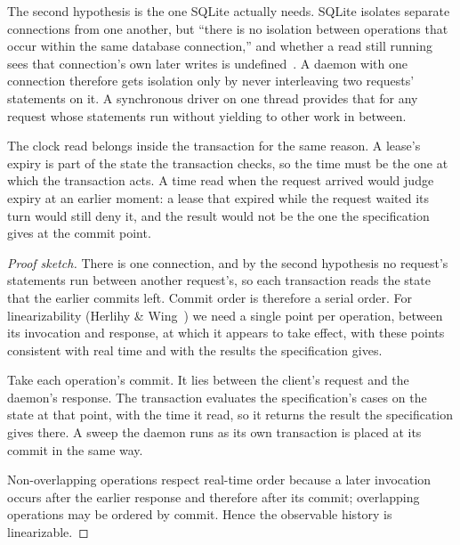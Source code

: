 \documentclass[11pt,a4paper]{article}
\theoremstyle{definition}
\theoremstyle{remark}
\begin{document}
The second hypothesis is the one SQLite actually needs. SQLite isolates
separate connections from one another, but ``there is no isolation between
operations that occur within the same database connection,'' and whether a
read still running sees that connection's own later writes is
undefined~. A daemon with one connection therefore
gets isolation only by never interleaving two requests' statements on it. A
synchronous driver on one thread provides that for any request whose
statements run without yielding to other work in between.

The clock read belongs inside the transaction for the same reason. A lease's
expiry is part of the state the transaction checks, so the time must be the
one at which the transaction acts. A time read when the request arrived would
judge expiry at an earlier moment: a lease that expired while the request
waited its turn would still deny it, and the result would not be the one the
specification gives at the commit point.

\begin{proof}[Proof sketch]
\setlength{\parskip}{4pt plus 1pt}
There is one connection, and by the second hypothesis no request's statements
run between another request's, so each transaction reads the state that the
earlier commits left. Commit order is therefore a serial order. For
linearizability (Herlihy \& Wing~) we need a single
point per operation, between its invocation and response, at which it appears
to take effect, with these points consistent with real time and with the
results the specification gives.

Take each operation's commit. It lies between the client's request and the
daemon's response. The transaction evaluates the specification's cases on the
state at that point, with the time it read, so it returns the result the
specification gives there. A sweep the daemon runs as its own transaction is
placed at its commit in the same way.

Non-overlapping operations respect real-time order because a
later invocation occurs after the earlier response and therefore after its commit;
overlapping operations may be ordered by commit. Hence the observable history is
linearizable.
\end{proof}
\end{document}
